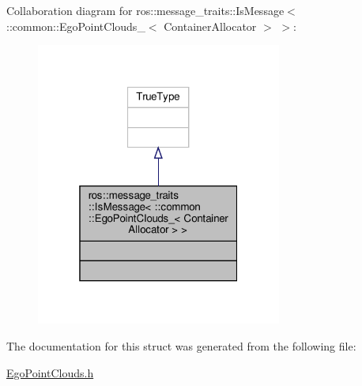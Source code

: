 Collaboration diagram for ros\+:\+:message\+\_\+traits\+:\+:Is\+Message$<$ \+:\+:common\+:\+:Ego\+Point\+Clouds\+\_\+$<$ Container\+Allocator $>$ $>$\+:\nopagebreak
\begin{figure}[H]
\begin{center}
\leavevmode
\includegraphics[width=229pt]{dc/d29/structros_1_1message__traits_1_1IsMessage_3_01_1_1common_1_1EgoPointClouds___3_01ContainerAllocator_01_4_01_4__coll__graph}
\end{center}
\end{figure}


The documentation for this struct was generated from the following file\+:\begin{DoxyCompactItemize}
\item 
\hyperlink{EgoPointClouds_8h}{Ego\+Point\+Clouds.\+h}\end{DoxyCompactItemize}
